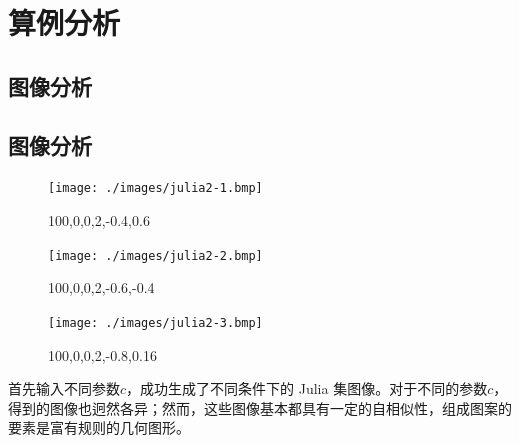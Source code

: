 \documentclass[8pt,c,compress,UTF8]{ctexbeamer}
\begin{document}
\section{算例分析}
\subsection{图像分析}
\begin{frame} 
\subsection{图像分析}
\begin{figure}[htbp]
\centering
\begin{minipage}{0.33\linewidth}
\centering
\texttt{[image: ./images/julia2-1.bmp]}
\caption{100,0,0,2,-0.4,0.6}
\label{fig2-1}
\end{minipage}\hfill
\begin{minipage}{0.33\linewidth}
\centering
\texttt{[image: ./images/julia2-2.bmp]}
\caption{100,0,0,2,-0.6,-0.4}
\label{fig2-2}
\end{minipage}\hfill
\begin{minipage}{0.33\linewidth}
\centering
\texttt{[image: ./images/julia2-3.bmp]}
\caption{100,0,0,2,-0.8,0.16}
\label{fig2-3}
\end{minipage}
\end{figure}
首先输入不同参数$c$，成功生成了不同条件下的 Julia 集图像。对于不同的参数$c$，得到的图像也迥然各异；然而，这些图像基本都具有一定的自相似性，组成图案的要素是富有规则的几何图形。
\end{frame}

\end{document}
